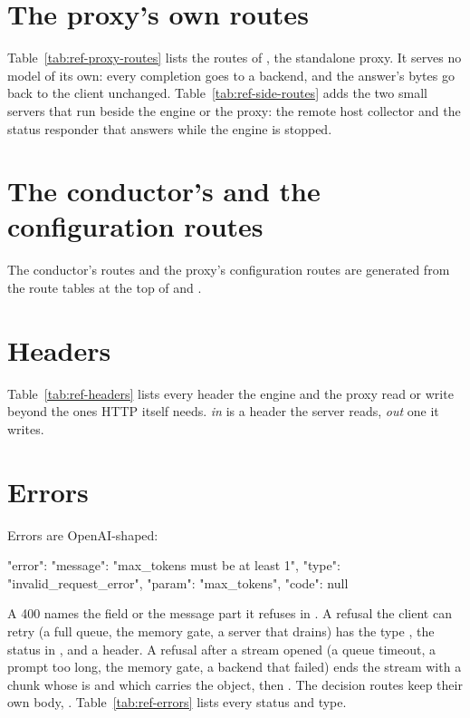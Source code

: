 

\section{The proxy's own routes}

Table~\ref{tab:ref-proxy-routes} lists the routes of , the standalone proxy. It serves no model of its own: every completion goes to a backend, and the answer's bytes go back to the client unchanged. Table~\ref{tab:ref-side-routes} adds the two small servers that run beside the engine or the proxy: the remote host collector and the status responder that answers while the engine is stopped.



\section{The conductor's and the configuration routes}

The conductor's routes and the proxy's configuration routes are generated from the route tables at the top of  and .



\section{Headers}

Table~\ref{tab:ref-headers} lists every header the engine and the proxy read or write beyond the ones HTTP itself needs. \emph{in} is a header the server reads, \emph{out} one it writes.



\section{Errors}

Errors are OpenAI-shaped:

\begin{jsonc}
{"error": {"message": "max_tokens must be at least 1", "type": "invalid_request_error",
           "param": "max_tokens", "code": null}}
\end{jsonc}

A 400 names the field or the message part it refuses in . A refusal the client can retry (a full queue, the memory gate, a server that drains) has the type , the status in , and a  header. A refusal after a stream opened (a queue timeout, a prompt too long, the memory gate, a backend that failed) ends the stream with a chunk whose  is  and which carries the  object, then \code{[DONE]}. The decision routes keep their own body, . Table~\ref{tab:ref-errors} lists every status and type.


